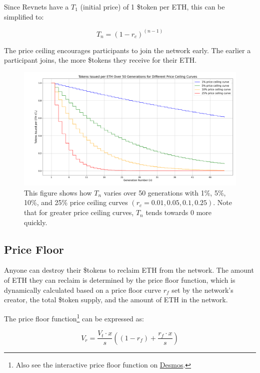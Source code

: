 \documentclass{article}
\begin{document}
Since Revnets have a $T_1$ (initial price) of 1 \$token per ETH, this can be simplified to:

\begin{equation}
  T_n = (1 - r_c)^{(n - 1)}
\end{equation}

The price ceiling encourages participants to join the network early. The earlier a participant joins, the more \$tokens they receive for their ETH.

\begin{figure}[h]
  \centering
  \includegraphics[width=\textwidth]{figures/multi-ceiling-curves.png}
  \caption{This figure shows how $T_n$ varies over 50 generations with 1\%, 5\%, 10\%, and 25\% price ceiling curves $(r_c = 0.01, 0.05, 0.1, 0.25)$. Note that for greater price ceiling curves, $T_n$ tends towards 0 more quickly.}
\end{figure}

\subsection{Price Floor}

Anyone can destroy their \$tokens to reclaim ETH from the network. The amount of ETH they can reclaim is determined by the price floor function, which is dynamically calculated based on a price floor curve $r_f$ set by the network's creator, the total \$token supply, and the amount of ETH in the network.

The price floor function\footnote{Also see the interactive price floor function on \href{https://www.desmos.com/calculator/9pewqesyj5}{Desmos}.} can be expressed as:

\begin{equation}
  V_r = \frac{V_t \cdot x}{s}\left(\left(1-r_f\right)+\frac{r_f \cdot x}{s}\right)
\end{equation}
\end{document}
